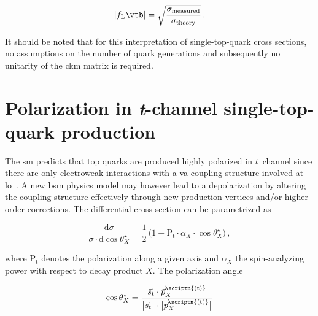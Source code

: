 \begin{equation}
|f_\mathrm{L}\vtb|=\sqrt{\frac{\sigma_\mathrm{measured}}{\sigma_\mathrm{theory}}}\,.
\end{equation}

It should be noted that for this interpretation of single-top-quark cross sections, no assumptions on the number of quark generations and subsequently no unitarity of the \gls{ckm} matrix is required.



\section{Polarization in \textit{t}-channel single-top-quark production}
\label{sec:theory-t-channel-polarization}

The \gls{sm} predicts that top quarks are produced highly polarized in $t$~channel since there are only electroweak interactions with a \gls{va} coupling structure involved at \gls{lo}~\cite{Bernreuther:2008ju}. A new \gls{bsm} physics model may however lead to a depolarization by altering the coupling structure effectively through new production vertices and/or higher order corrections. The differential cross section can be parametrized as

\begin{equation}
\frac{\mathrm{d}\sigma}{\sigma\cdot\mathrm{d}\cos\theta^\star_{X}}=\frac{1}{2}\,\Big(1+\mathrm{P}_\mathrm{t}\cdot\alpha_{X}\cdot\cos\theta^\star_{X}\Big)\,,
\end{equation}

where $\mathrm{P}_\mathrm{t}$ denotes the polarization along a given axis and $\alpha_{X}$ the spin-analyzing power with respect to decay product $X$. The polarization angle

\begin{equation}
\cos\theta^\star_{X}=\frac{\vec{s}_\mathrm{t}\cdot \vec{p}_{X}^\scriptn{\mathrm{(t)}}}{\big|\vec{s}_\mathrm{t}\big|\cdot\big|\vec{p}_{X}^\scriptn{\mathrm{(t)}}\big|}
\end{equation}

